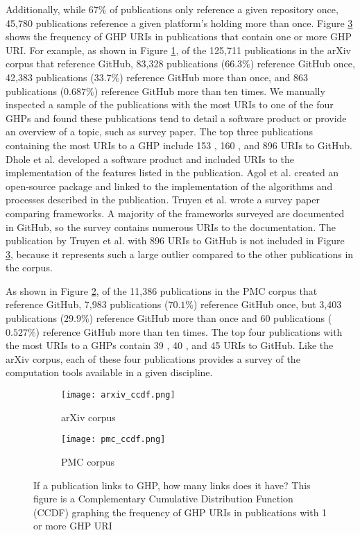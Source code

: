 Additionally, while 67\% of publications only reference a given repository once, 45,780 publications reference a given platform's holding more than once. Figure \ref{fig:ccdf} shows the frequency of GHP URIs in publications that contain one or more GHP URI. For example, as shown in Figure \ref{fig:arxiv_ccdf}, of the 125,711 publications in the arXiv corpus that reference GitHub, 83,328 publications ($66.3\%$) reference GitHub once, 42,383 publications ($33.7\%$) reference GitHub more than once, and 863 publications ($0.687\%$) reference GitHub more than ten times. We manually inspected a sample of the publications with the most URIs to one of the four GHPs and found these publications tend to detail a software product or provide an overview of a topic, such as survey paper. The top three publications containing the most URIs to a GHP include 153 \cite{dhole-arxiv2021}, 160 \cite{agol-arxiv2021}, and 896 \cite{truyen-arxiv2021} URIs to GitHub. Dhole et al. \cite{dhole-arxiv2021} developed a software product and included URIs to the implementation of the features listed in the publication. Agol et al. \cite{agol-arxiv2021} created an open-source package and linked to the implementation of the algorithms and processes described in the publication. Truyen et al. \cite{truyen-arxiv2021} wrote a survey paper comparing frameworks. A majority of the frameworks surveyed are documented in GitHub, so the survey contains numerous URIs to the documentation. The publication by Truyen et al. with 896 URIs to GitHub is not included in Figure \ref{fig:ccdf}, because it represents such a large outlier compared to the other publications in the corpus.

As shown in Figure \ref{fig:pmc_ccdf}, of the 11,386 publications in the PMC corpus that reference GitHub, 7,983 publications ($70.1\%$) reference GitHub once, but 3,403 publications ($29.9\%$) reference GitHub more than once and 60 publications ($0.527\%$) reference GitHub more than ten times. The top four publications with the most URIs to a GHPs contain 39 \cite{kuo-pmc2019,kayani-pmc2021}, 40 \cite{chen-pmc2021}, and 45 \cite{yang-pmc2021} URIs to GitHub. Like the arXiv corpus, each of these four publications provides a survey of the computation tools available in a given discipline.

\begin{figure}[htbp]
\centering
\begin{subfigure}{\textwidth}
    \texttt{[image: arxiv\_ccdf.png]}
    \caption{arXiv corpus}
    \label{fig:arxiv_ccdf}
\end{subfigure}
\hfill
\begin{subfigure}{\textwidth}
    \texttt{[image: pmc\_ccdf.png]}
    \caption{PMC corpus}
    \label{fig:pmc_ccdf}
\end{subfigure}
        
\caption{If a publication links to GHP, how many links does it have? This figure is a Complementary Cumulative Distribution Function (CCDF) graphing the frequency of GHP URIs in publications with 1 or more GHP URI}
\label{fig:ccdf}
\end{figure}

